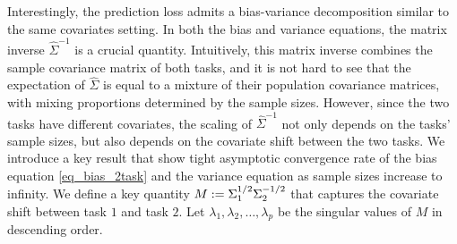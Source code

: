 Interestingly, the prediction loss admits a bias-variance decomposition similar to the same covariates setting.
In both the bias and variance equations, the matrix inverse $\hat{\Sigma}^{-1}$ is a crucial quantity.
Intuitively, this matrix inverse combines the sample covariance matrix of both tasks, and it is not hard to see that the expectation of $\hat{\Sigma}$ is equal to a mixture of their population covariance matrices, with mixing proportions determined by the sample sizes.
However, since the two tasks have different covariates, the scaling of $\hat{\Sigma}^{-1}$ not only depends on the tasks' sample sizes, but also depends on the covariate shift between the two tasks.
We introduce a key result that show tight asymptotic convergence rate of the bias equation \eqref{eq_bias_2task} and the variance equation  as sample sizes increase to infinity.
We define a key quantity $M := \Sigma_1^{1/2}\Sigma_2^{-1/2}$ that captures the covariate shift between task $1$ and task $2$.
Let $\lambda_1, \lambda_2, \dots, \lambda_p$ be the singular values of $M$ in descending order.

